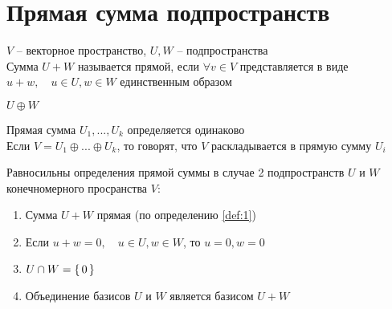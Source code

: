 \section{Прямая сумма подпространств}

\begin{definition}\label{def:1}
	$ V $ -- векторное пространство, $U, W $ -- подпространства \\
    Сумма $ U + W $ называется прямой, если $ \forall v \in V $ представляется в виде $ u + w, \quad u \in U, w \in W $ единственным образом
\end{definition}

\begin{notation}
	$ U \oplus W $
\end{notation}

\begin{remark}
	Прямая сумма $U_1, ..., U_k$ определяется одинаково \\
    Если $ V = U_1 \oplus ... \oplus U_k $, то говорят, что $V$ раскладывается в прямую сумму $U_i$
\end{remark}

\begin{theorem}
	Равносильны определения прямой суммы в случае 2 подпространств $U$ и $W$ конечномерного просранства $V$:
    \begin{enumerate}
        \item \label{it:2:1} Сумма $U + W $ прямая (по определению \ref{def:1})
        \item \label{it:2:2} Если $ u + w = 0, \quad u \in U, w \in W $, то $u = 0, w = 0 $
        \item \label{it:2:3} $ U \cap W = \set{0} $
        \item \label{it:2:4} Объединение базисов $U$ и $W$ является базисом $U + W$
    \end{enumerate}
\end{theorem}

